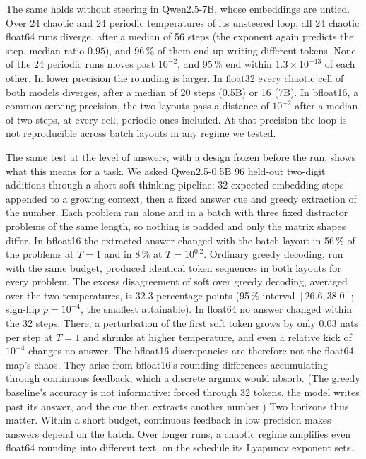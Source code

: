 The same holds without steering in Qwen2.5-7B, whose embeddings are untied. Over 24 chaotic and 24 periodic
temperatures of its unsteered loop, all 24 chaotic float64 runs diverge, after a median of 56 steps (the exponent again
predicts the step, median ratio $0.95$), and 96\,\% of them end up writing different tokens. None of the 24 periodic runs
moves past $10^{-2}$, and 95\,\% end within $1.3\times10^{-13}$ of each other. In lower precision the rounding is
larger. In float32 every chaotic cell of both models diverges, after a median of 20 steps (0.5B) or 16 (7B). In
bfloat16, a common serving precision, the two layouts pass a distance of $10^{-2}$ after a median of two steps, at every
cell, periodic ones included. At that precision the loop is not reproducible across batch layouts in any regime we
tested.

The same test at the level of answers, with a design frozen before the run, shows what this means for a task. We
asked Qwen2.5-0.5B 96 held-out two-digit additions through a short soft-thinking pipeline: 32 expected-embedding steps
appended to a growing context, then a fixed answer cue and greedy extraction of the number. Each problem ran alone and
in a batch with three fixed distractor problems of the same length, so nothing is padded and only the matrix shapes
differ. In bfloat16 the extracted answer changed with the batch layout in 56\,\% of the problems at $T=1$ and in
8\,\% at $T=10^{0.2}$. Ordinary greedy decoding, run with the same budget, produced identical token sequences in both
layouts for every problem. The excess disagreement of soft over greedy decoding, averaged over the two temperatures,
is 32.3 percentage points (95\,\% interval $[26.6,38.0]$; sign-flip $p=10^{-4}$, the smallest attainable). In float64 no
answer changed within the 32 steps. There, a perturbation of the first soft token grows by only $0.03$ nats per step
at $T=1$ and shrinks at higher temperature, and even a relative kick of $10^{-4}$ changes no answer. The bfloat16
discrepancies are therefore not the float64 map's chaos. They arise from bfloat16's rounding differences accumulating
through continuous feedback, which a discrete argmax would absorb. (The greedy baseline's accuracy is not
informative: forced through 32 tokens, the model writes past its answer, and the cue then extracts another number.)
Two horizons thus matter. Within a short budget, continuous feedback in low precision makes answers depend on the
batch. Over longer runs, a chaotic regime amplifies even float64 rounding into different text, on the schedule its
Lyapunov exponent sets.
